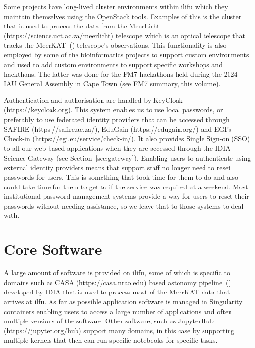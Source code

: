 \documentclass{iau_FM}
\begin{document}
Some projects have long-lived cluster environments within ilifu which they maintain themselves using
the OpenStack tools.
Examples of this is the cluster that is used to process the data from the MeerLicht
 (https://science.uct.ac.za/meerlicht) telescope which
is an optical telescope that tracks the MeerKAT~(\cite{meerkat}) telescope's observations. 
This functionality
is also employed
by some of the bioinformatics projects to support custom environments and used to add
custom environments to support specific workshops and hackthons. The latter was done for the
 FM7 hackathons held during the 2024 IAU General Assembly in Cape Town (see FM7 summary, this volume). 

Authentication and authorisation are handled by KeyCloak (https://keycloak.org). 
This system enables us 
to use local passwords,
or preferably to use federated identity providers that can be accessed through SAFIRE 
(https://safire.ac.za/), 
EduGain (https://edugain.org/) and EGI's Check-in (https://egi.eu/service/check-in/).
 It also provides Single Sign-on (SSO)
to all our 
web based applications when they are accessed through the 
IDIA Science Gateway (see Section~\ref{sec:gateway}).
Enabling users to authenticate using external identity providers means that support staff no longer need
to reset passwords for users. This is something that took time for them to do and also could take
time for them to get to if the service was required at a weekend. Most institutional password
management systems provide a way for users to reset their passwords without needing assistance,
so we leave that to those systems to deal with.

\section{Core Software}
\label{sec:core_software}

A large amount of software is provided on ilifu, some of which is specific to domains such as {\sc CASA}
(https://casa.nrao.edu) based
astonomy pipeline~(\cite{pipelinepaper})
developed by IDIA that is used to process most of the MeerKAT data that arrives
at {\sc ilfu}. As far as possible application software is managed in Singularity containers enabling users
to access a large number of applications and often multiple versions of the software. Other software, such
as JupyterHub (https://jupyter.org/hub) support many domains, in this case by 
supporting multiple
 kernels that then can run 
specific notebooks for specific tasks.
\end{document}
